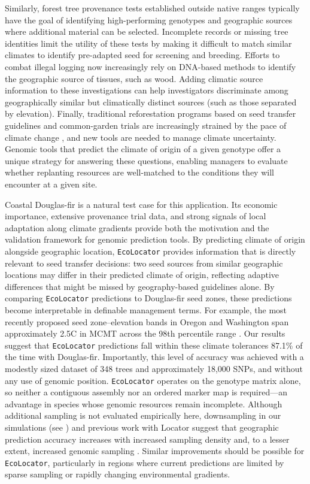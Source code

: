 \documentclass[]{article}
\newcommand{\dfir}{Douglas-fir\xspace}
\newcommand{\ecolocator}{\texttt{EcoLocator}\xspace}
\begin{document}
Similarly,
forest tree provenance tests established outside native ranges
typically have the goal of identifying high-performing genotypes and geographic
sources where additional material can be selected.
Incomplete records or missing tree identities limit the utility of these tests
by making it difficult to match similar climates to identify pre-adapted seed for screening
and breeding.
Efforts to combat illegal logging now increasingly rely
on DNA-based methods to identify the geographic source of tissues,
such as wood.
Adding climatic source information to these investigations
can help investigators discriminate among geographically similar
but climatically distinct sources (such as those separated by elevation).
Finally,
traditional reforestation programs based on seed transfer guidelines
and common-garden trials are increasingly strained
by the pace of climate change \citep{aitken_bemmels_2016},
and new tools are needed to manage climate uncertainty.
Genomic tools that predict the climate of origin of a given genotype
offer a unique strategy for answering these questions,
enabling managers to evaluate whether replanting resources
are well-matched to the conditions they will encounter
at a given site.

Coastal \dfir is a natural test case for this application.
Its economic importance,
extensive provenance trial data,
and strong signals of local adaptation along climate gradients
provide both the motivation and the validation framework
for genomic prediction tools.
By predicting climate of origin alongside geographic location,
\ecolocator provides information that is directly relevant
to seed transfer decisions:
two seed sources from similar geographic locations may differ
in their predicted climate of origin,
reflecting adaptive differences that might be missed
by geography-based guidelines alone.
By comparing \ecolocator predictions to \dfir seed zones,
these predictions become interpretable in definable management terms.
For example,
the most recently proposed seed zone--elevation bands
in Oregon and Washington span approximately
2.5\textdegree C in MCMT across the 98th percentile range \citep{shalev_zone_2026}.
Our results suggest that \ecolocator predictions fall
within these climate tolerances 87.1\% of the time with \dfir. 
Importantly,
this level of accuracy was achieved with a modestly sized dataset
of 348 trees and approximately 18,000 SNPs,
and without any use of genomic position.
\ecolocator operates on the genotype matrix alone,
so neither a contiguous assembly nor an ordered marker map is required---an
advantage in species whose genomic resources remain incomplete.
Although additional sampling is not evaluated empirically here, downsampling in
our simulations (see ) and
previous work with Locator suggest that geographic prediction accuracy
increases with increased sampling density and,
to a lesser extent,
increased genomic sampling \citep{battey_predicting_2020}.
Similar improvements should be possible for \ecolocator,
particularly in regions where current predictions are limited
by sparse sampling or rapidly changing environmental gradients.
\end{document}
